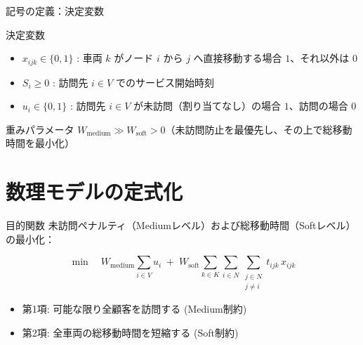 \documentclass[aspectratio=169,11pt]{beamer}
\begin{document}
\begin{frame}{記号の定義：決定変数}
  \begin{block}{決定変数}
    \begin{itemize}
      \item $x_{ijk} \in \{0, 1\}$ : 車両 $k$ がノード $i$ から $j$ へ直接移動する場合 $1$、それ以外は $0$
      \item $S_i \ge 0$ : 訪問先 $i \in V$ でのサービス開始時刻
      \item $u_i \in \{0, 1\}$ : 訪問先 $i \in V$ が未訪問（割り当てなし）の場合 $1$、訪問の場合 $0$
    \end{itemize}
  \end{block}
  \vspace{0.5em}
  \begin{alertblock}{重みパラメータ}
    $W_{\text{medium}} \gg W_{\text{soft}} > 0$（未訪問防止を最優先し、その上で総移動時間を最小化）
  \end{alertblock}
\end{frame}

\section{数理モデルの定式化}

\begin{frame}{目的関数}
  未訪問ペナルティ（Mediumレベル）および総移動時間（Softレベル）の最小化：

  \[
    \min \quad W_{\text{medium}} \sum_{i \in V} u_i \;+\; W_{\text{soft}} \sum_{k \in K} \sum_{i \in N} \sum_{\substack{j \in N \\ j \neq i}} t_{ijk} \, x_{ijk}
  \]

  \begin{itemize}
    \item 第1項: 可能な限り全顧客を訪問する (Medium制約)
    \item 第2項: 全車両の総移動時間を短縮する (Soft制約)
  \end{itemize}
\end{frame}
\end{document}

